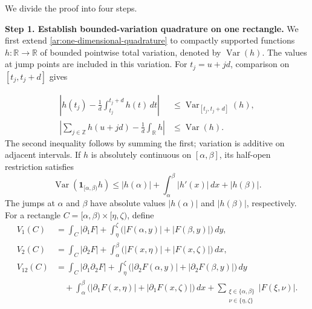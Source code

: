 \documentclass[twoside]{aomart}
\makeatletter
\theoremstyle{paperplain}
\theoremstyle{paperdefinition}
\renewenvironment{proof}[1][\proofname]{\par\pushQED{\qed}%
  \normalfont\topsep6\p@\@plus3\p@\relax\trivlist
  \item[\hskip\labelsep\itshape #1\@addpunct{.}]\ignorespaces
}{\popQED\endtrivlist\@endpefalse}
\newcommand{\Z}{\mathbb Z}
\newcommand{\R}{\mathbb R}
\numberwithin{equation}{section}
\makeatother
\begin{document}
\begin{proof}
We divide the proof into four steps.
\par
\medskip
\noindent\textbf{Step 1. Establish bounded-variation quadrature on one rectangle.}
We first extend \eqref{ar:one-dimensional-quadrature} to
compactly supported functions $h:\R\to\R$ of bounded
pointwise total variation, denoted by $\operatorname{Var}(h)$.
The values at jump points are included in this variation.
For $t_j=u+jd$, comparison on $[t_j,t_j+d]$ gives

\begin{equation}
 \begin{aligned}
 \left|h(t_j)-\frac1d\int_{t_j}^{t_j+d}h(t)\,dt\right|
 &\le \operatorname{Var}_{[t_j,t_j+d]}(h),\\
 \left|\sum_{j\in\Z}h(u+jd)-\frac1d\int_\R h\right|
 &\le \operatorname{Var}(h).
 \end{aligned}
 \label{ar:spatial-bv-quadrature}
\end{equation}
The second inequality follows by summing the first; variation
is additive on adjacent intervals. If $h$ is absolutely
continuous on $[\alpha,\beta]$, its half-open restriction satisfies
\begin{equation}
 \operatorname{Var}(\mathbf1_{[\alpha,\beta)}h)
 \le |h(\alpha)|+\int_\alpha^\beta|h'(x)|\,dx+|h(\beta)|.
 \label{ar:spatial-cutoff-variation}
\end{equation}
The jumps at $\alpha$ and $\beta$ have absolute values
$|h(\alpha)|$ and $|h(\beta)|$, respectively.
For a rectangle $C=[\alpha,\beta)\times[\eta,\zeta)$, define
\begin{equation}
 \begin{aligned}
 V_1(C)&=\int_C|\partial_1F|
   +\int_\eta^\zeta\bigl(|F(\alpha,y)|+|F(\beta,y)|\bigr)\,dy,\\
 V_2(C)&=\int_C|\partial_2F|
   +\int_\alpha^\beta\bigl(|F(x,\eta)|+|F(x,\zeta)|\bigr)\,dx,\\
 V_{12}(C)&=\int_C|\partial_1\partial_2F|
   +\int_\eta^\zeta\bigl(|\partial_2F(\alpha,y)|
                         +|\partial_2F(\beta,y)|\bigr)\,dy\\
 &\quad+\int_\alpha^\beta\bigl(|\partial_1F(x,\eta)|
                         +|\partial_1F(x,\zeta)|\bigr)\,dx
   +\sum_{\substack{\xi\in\{\alpha,\beta\}\\
                    \nu\in\{\eta,\zeta\}}}|F(\xi,\nu)|.
 \end{aligned}
 \label{ar:spatial-boundary-quantities}
\end{equation}

\end{proof}
\end{document}

